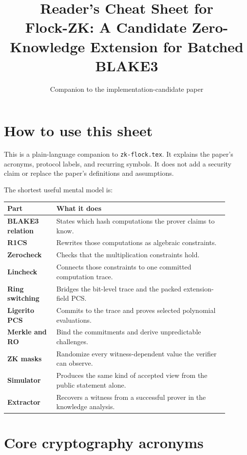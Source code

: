 \documentclass[11pt]{article}
\title{Reader's Cheat Sheet for\\
\large Flock-ZK: A Candidate Zero-Knowledge Extension for Batched BLAKE3}
\author{Companion to the implementation-candidate paper}
\date{}
\begin{document}
\maketitle

\section*{How to use this sheet}

This is a plain-language companion to \texttt{zk-flock.tex}. It explains the
paper's acronyms, protocol labels, and recurring symbols. It does not add a
security claim or replace the paper's definitions and assumptions.

The shortest useful mental model is:

\begin{center}
\begin{tabular}{@{}>{\raggedright\arraybackslash\bfseries}p{0.20\linewidth}
                    >{\raggedright\arraybackslash}p{0.70\linewidth}@{}}
\toprule
Part & What it does \\
\midrule
BLAKE3 relation & States which hash computations the prover claims to know. \\
R1CS & Rewrites those computations as algebraic constraints. \\
Zerocheck & Checks that the multiplication constraints hold. \\
Lincheck & Connects those constraints to one committed computation trace. \\
Ring switching & Bridges the bit-level trace and the packed extension-field PCS. \\
Ligerito PCS & Commits to the trace and proves selected polynomial evaluations. \\
Merkle and RO & Bind the commitments and derive unpredictable challenges. \\
ZK masks & Randomize every witness-dependent value the verifier can observe. \\
Simulator & Produces the same kind of accepted view from the public statement alone. \\
Extractor & Recovers a witness from a successful prover in the knowledge analysis. \\
\bottomrule
\end{tabular}
\end{center}

\section*{Core cryptography acronyms}
\end{document}
